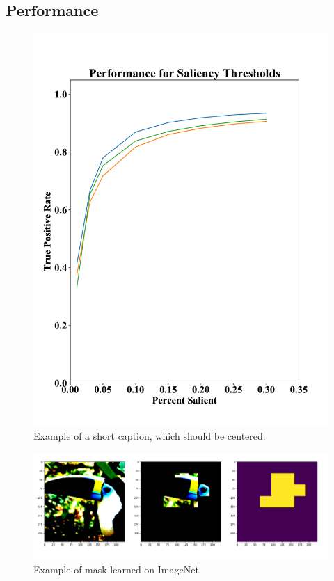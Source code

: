 \documentclass[10pt,twocolumn,letterpaper]{article}
\begin{document}
\subsection{Performance}

\begin{figure}
\begin{center}
\includegraphics[width=\columnwidth]{figures/tpr.pdf}

\end{center}
   \caption{Example of a short caption, which should be centered.}
\label{fig:short}
\end{figure}


\begin{figure}
	\begin{center}
		\includegraphics[width=\columnwidth]{figures/bird_mask_predict.png}
		
	\end{center}
	\caption{Example of mask learned on ImageNet}
	\label{fig:short}
\end{figure}
\end{document}
